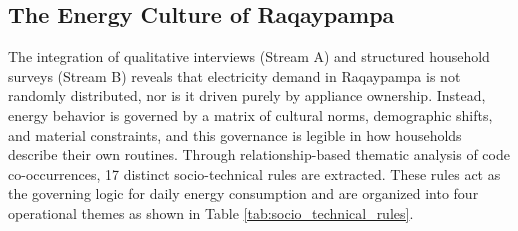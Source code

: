 \documentclass[final,3p,times,onecolumn]{elsarticle}
\begin{document}
\subsection{The Energy Culture of Raqaypampa}
\label{sec:energy-culture}

The integration of qualitative interviews (Stream A) and structured household surveys (Stream B) reveals that electricity demand in Raqaypampa is not randomly distributed, nor is it driven purely by appliance ownership. Instead, energy behavior is governed by a matrix of cultural norms, demographic shifts, and material constraints, and this governance is legible in how households describe their own routines. Through relationship-based thematic analysis of code co-occurrences, 17 distinct socio-technical rules are extracted. These rules act as the governing logic for daily energy consumption and are organized into four operational themes as shown in Table \ref{tab:socio_technical_rules}.
\end{document}
